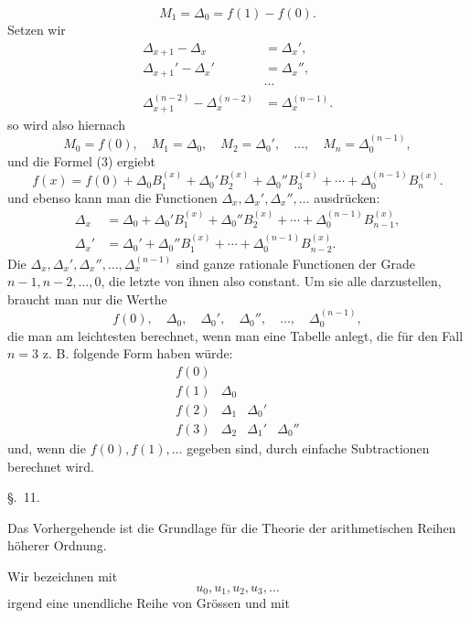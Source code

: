 
\[
M_1=\Delta_0=f(1)-f(0).
\]
Setzen wir
\begin{equation}
\begin{aligned}
 \Delta_{x+1}-\Delta_x&=\Delta_x',\\
 \Delta_{x+1}'-\Delta_x'&=\Delta_x'',\\
 &\cdots\\
 \Delta_{x+1}^{(n-2)}-\Delta_x^{(n-2)}&=\Delta_x^{(n-1)}.
\end{aligned}
\tag{6}
\end{equation}
so wird also hiernach
\[
 M_0=f(0),\quad M_1=\Delta_0,
 \quad M_2=\Delta_0',\quad\ldots,\quad M_n=\Delta_0^{(n-1)},
\]
und die Formel (3) ergiebt
\begin{equation}
 f(x)=f(0)+\Delta_0B_1^{(x)}+\Delta_0'B_2^{(x)}+\Delta_0''B_3^{(x)}+\cdots+\Delta_0^{(n-1)}B_n^{(x)}.
\tag{7}
\end{equation}
und ebenso kann man die Functionen $\Delta_x,\Delta_x',\Delta_x'',\ldots$ ausdrücken:
\begin{equation}
\begin{aligned}
 \Delta_x&=\Delta_0+\Delta_0'B_1^{(x)}+\Delta_0''B_2^{(x)}+\cdots+\Delta_0^{(n-1)}B_{n-1}^{(x)},\\
 \Delta_x'&=\Delta_0'+\Delta_0''B_1^{(x)}+\cdots+\Delta_0^{(n-1)}B_{n-2}^{(x)}.
\end{aligned}
\tag{8}
\end{equation}
Die $\Delta_x,\Delta_x',\Delta_x'',\ldots,\Delta_x^{(n-1)}$ sind ganze rationale Functionen der Grade $n-1,n-2,\ldots,0$, die letzte von ihnen also constant. Um sie alle darzustellen, braucht man nur die Werthe
\[
 f(0),\quad \Delta_0,\quad \Delta_0',\quad \Delta_0'',\quad\ldots,\quad \Delta_0^{(n-1)},
\]
die man am leichtesten berechnet, wenn man eine Tabelle anlegt, die für den Fall $n=3$ z. B. folgende Form haben würde:
\[
\begin{array}{c|c|c|c}
f(0) &&&\\
f(1)&\Delta_0&&\\
f(2)&\Delta_1&\Delta_0'&\\
f(3)&\Delta_2&\Delta_1'&\Delta_0''
\end{array}
\]
und, wenn die $f(0),f(1),\ldots$ gegeben sind, durch einfache Subtractionen berechnet wird.

\begin{center}
{\large \S.\ 11.}

\vspace{0.5em}
{\large{}}
\end{center}

Das Vorhergehende ist die Grundlage für die Theorie der arithmetischen Reihen höherer Ordnung.

Wir bezeichnen mit
\begin{equation}
u_0,u_1,u_2,u_3,\ldots
\tag{1}
\end{equation}
irgend eine unendliche Reihe von Grössen und mit
